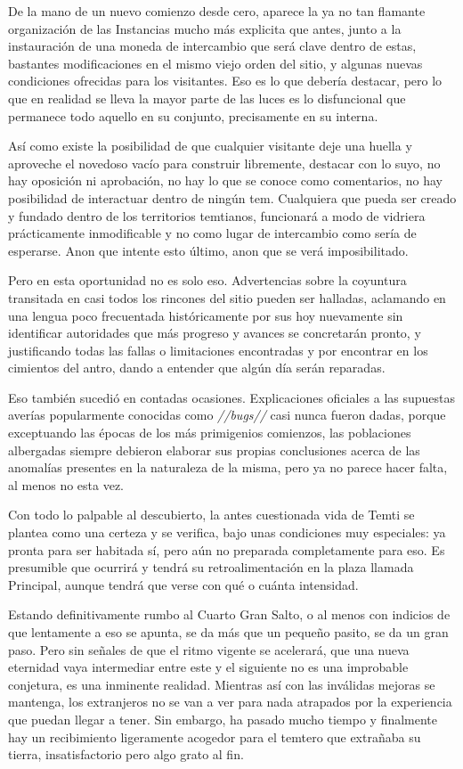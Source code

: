 \documentclass[
  spanish,
]{book}
\begin{document}
De la mano de un nuevo comienzo desde cero, aparece la ya no tan flamante organización de las Instancias mucho más explicita que antes, junto a la instauración de una moneda de intercambio que será clave dentro de estas, bastantes modificaciones en el mismo viejo orden del sitio, y algunas nuevas condiciones ofrecidas para los visitantes. Eso es lo que debería destacar, pero lo que en realidad se lleva la mayor parte de las luces es lo disfuncional que permanece todo aquello en su conjunto, precisamente en su interna.

Así como existe la posibilidad de que cualquier visitante deje una huella y aproveche el novedoso vacío para construir libremente, destacar con lo suyo, no hay oposición ni aprobación, no hay lo que se conoce como comentarios, no hay posibilidad de interactuar dentro de ningún tem. Cualquiera que pueda ser creado y fundado dentro de los territorios temtianos, funcionará a modo de vidriera prácticamente inmodificable y no como lugar de intercambio como sería de esperarse. Anon que intente esto último, anon que se verá imposibilitado.

Pero en esta oportunidad no es solo eso. Advertencias sobre la coyuntura transitada en casi todos los rincones del sitio pueden ser halladas, aclamando en una lengua poco frecuentada históricamente por sus hoy nuevamente sin identificar autoridades que más progreso y avances se concretarán pronto, y justificando todas las fallas o limitaciones encontradas y por encontrar en los cimientos del antro, dando a entender que algún día serán reparadas.

Eso también sucedió en contadas ocasiones. Explicaciones oficiales a las supuestas averías popularmente conocidas como \emph{//bugs//} casi nunca fueron dadas, porque exceptuando las épocas de los más primigenios comienzos, las poblaciones albergadas siempre debieron elaborar sus propias conclusiones acerca de las anomalías presentes en la naturaleza de la misma, pero ya no parece hacer falta, al menos no esta vez.

Con todo lo palpable al descubierto, la antes cuestionada vida de Temti se plantea como una certeza y se verifica, bajo unas condiciones muy especiales: ya pronta para ser habitada sí, pero aún no preparada completamente para eso. Es presumible que ocurrirá y tendrá su retroalimentación en la plaza llamada Principal, aunque tendrá que verse con qué o cuánta intensidad.

Estando definitivamente rumbo al Cuarto Gran Salto, o al menos con indicios de que lentamente a eso se apunta, se da más que un pequeño pasito, se da un gran paso. Pero sin señales de que el ritmo vigente se acelerará, que una nueva eternidad vaya intermediar entre este y el siguiente no es una improbable conjetura, es una inminente realidad. Mientras así con las inválidas mejoras se mantenga, los extranjeros no se van a ver para nada atrapados por la experiencia que puedan llegar a tener. Sin embargo, ha pasado mucho tiempo y finalmente hay un recibimiento ligeramente acogedor para el temtero que extrañaba su tierra, insatisfactorio pero algo grato al fin.
\end{document}
